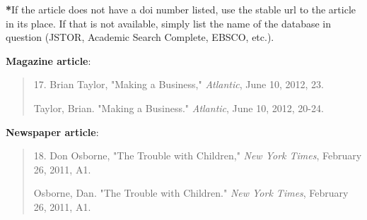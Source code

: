 \textbf{*}If the article does not have a doi number listed, use the stable url to the 
article in its place. If that is not available, simply list the name of the database in 
question (JSTOR, Academic Search Complete, EBSCO, etc.).


\textbf{Magazine article}:
\begin{quote}
 17. Brian Taylor, "Making a Business," \emph{Atlantic}, June 10, 2012, 23.

Taylor, Brian. "Making a Business." \emph{Atlantic}, June 10, 2012, 20-24.
\end{quote}


\textbf{Newspaper article}:
\begin{quote}
 18. Don Osborne, "The Trouble with Children," \emph{New York Times}, February 26, 
2011, A1.

Osborne, Dan. "The Trouble with Children." \emph{New York Times}, February  26, 
2011, A1.
\end{quote}

